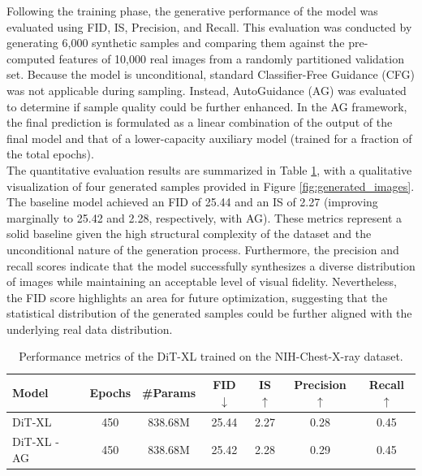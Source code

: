 \noindent
Following the training phase, the generative performance of the model was evaluated using FID, IS, Precision, and Recall. This evaluation 
was conducted by generating 6,000 synthetic samples and comparing them against the pre-computed 
features of 10,000 real images from a randomly partitioned validation set. Because the model is unconditional, standard Classifier-Free 
Guidance (CFG) \cite{ho2022classifierfreediffusionguidance} was not applicable during sampling. Instead, AutoGuidance (AG) 
\cite{karras2024guidingdiffusionmodelbad} was evaluated to determine if sample quality could be further enhanced. In the AG framework, 
the final prediction is formulated as a linear combination of the output of the final model and that of a lower-capacity auxiliary model 
(trained for a fraction of the total epochs). \\
The quantitative evaluation results are summarized in Table \ref{tab:exp1_results}, with a qualitative visualization of four generated 
samples provided in Figure \ref{fig:generated_images}. The baseline model achieved an FID of 25.44 and an IS of 2.27 (improving marginally 
to 25.42 and 2.28, respectively, with AG). These metrics represent a solid baseline given the high structural complexity of the dataset 
and the unconditional nature of the generation process. Furthermore, the precision and recall scores indicate that the model successfully 
synthesizes a diverse distribution of images while maintaining an acceptable level of visual fidelity. Nevertheless, the FID score 
highlights an area for future optimization, suggesting that the statistical distribution of the generated samples could be further aligned 
with the underlying real data distribution. 
\begin{table}
    \centering
    \caption{Performance metrics of the DiT-XL trained on the NIH-Chest-X-ray dataset.}
    \label{tab:exp1_results}
    \begin{tabular}{@{}lcccccc@{}}
        \toprule
        \textbf{Model}      & \textbf{Epochs}       & \#\textbf{Params}      & \textbf{FID}$\downarrow$      & \textbf{IS}$\uparrow$     & \textbf{Precision}$\uparrow$      & \textbf{Recall}$\uparrow$     \\
        \midrule
        DiT-XL   & 450                    & 838.68M                    & 25.44                            & 2.27                        & 0.28                    & 0.45                   \\
        DiT-XL - AG   & 450                    & 838.68M                    & 25.42                            & 2.28                        & 0.29                    & 0.45                    \\
        \bottomrule
    \end{tabular}
\end{table}

